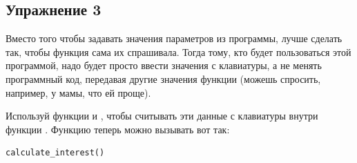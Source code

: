 \subsection*{Упражнение 3}

Вместо того чтобы задавать значения параметров из программы, лучше сделать так, чтобы функция сама их спрашивала. Тогда тому, кто будет пользоваться этой программой, надо будет просто ввести значения с клавиатуры, а не менять программный код, передавая другие значения функции (можешь спросить, например, у мамы, что ей проще).

Используй функции  и , чтобы считывать эти данные с клавиатуры внутри функции . Функцию теперь можно вызывать вот так:

\begin{listing}
\begin{verbatim}
calculate_interest()
\end{verbatim}
\end{listing}
